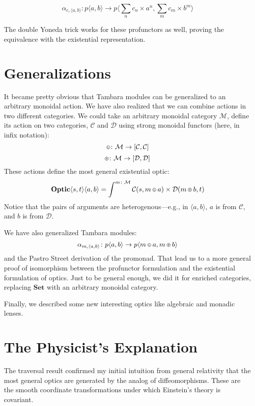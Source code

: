 \documentclass[11pt]{amsart}
\newcommand*\circled[3]
  {\tikz[baseline={([yshift=#2]current bounding box.center)}]{
      \node[shape=circle,draw,inner sep=#1] (char) {#3};}}
\newcommand{\actL}{\mathbin{\circled{0.5pt}{-0.55ex}{\scalebox{0.75}{\tiny{$\mathsf{L}$}}}}}
\newcommand{\actR}{\mathbin{\circled{0.5pt}{-0.55ex}{\scalebox{0.75}{\tiny{$\mathsf{R}$}}}}}
\begin{document}
\[ \alpha_{c, \langle a, b \rangle} \colon p \langle a, b \rangle \to p\langle \sum_n c_n \times a^n, \sum_m c_m \times b^m \rangle \]

The double Yoneda trick works for these profunctors as well, proving the equivalence with the existential representation.

\section{Generalizations}

It became pretty obvious that Tambara modules can be generalized to an arbitrary monoidal action. We have also realized that we can combine actions in two different categories. We could take an arbitrary monoidal category $\mathcal{M}$, define its action on two categories, $\mathcal{C}$ and $\mathcal{D}$ using strong monoidal functors (here, in infix notation):
\[ \actL \colon \mathcal{M} \to [\mathcal{C}, \mathcal{C}] \]
\[ \actR \colon \mathcal{M} \to [\mathcal{D}, \mathcal{D}] \]
These actions define the most general existential optic:
\[ \mathbf{Optic} \langle s, t \rangle \langle a, b \rangle = \int^{m \colon \mathcal{M}} \mathcal{C}(s, m \actL a) \times \mathcal{D}(m \actR b, t)\]
Notice that the pairs of arguments are heterogenous---e.g., in $\langle a, b \rangle$, $a$ is from $ \mathcal{C}$, and $b$ is from $ \mathcal{D}$.

We have also generalized Tambara modules:
\[ \alpha_{m, \langle a, b \rangle} \colon p \langle a, b \rangle \to p \langle m \actL a, m \actR b\rangle \]
and the Pastro Street derivation of the promonad. That lead us to a more general proof of isomorphism between the profunctor formulation and the existential formulation of optics. Just to be general enough, we did it for enriched categories, replacing $\mathbf{Set}$ with an arbitrary monoidal category. 

Finally, we described some new interesting optics like algebraic and monadic lenses.

\section{The Physicist's Explanation}

The traversal result confirmed my initial intuition from general relativity that the most general optics are generated by the analog of diffeomorphisms. These are the smooth coordinate transformations under which Einstein's theory is covariant. 
\end{document}

